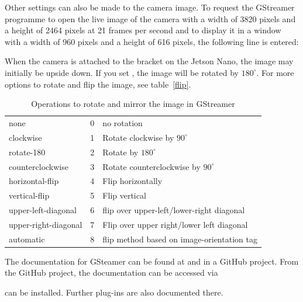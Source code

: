 Other settings can also be made to the camera image. To request the GStreamer programme to open the live image of the camera with a width of 3820 pixels and a height of 2464 pixels at 21 frames per second and to display it in a window with a width of 960 pixels and a height of 616 pixels, the following line is entered:

\medskip




    

When the camera is attached to the bracket on the Jetson Nano, the image may initially be upside down. If you set , the image will be rotated by $180^\circ$. For more options to rotate and flip the image, see table~\ref{flip}.

\medskip

\medskip
\begin{table} [H]
    \centering
    \begin{tabular} {l c l}
        none                 & 0 & no rotation \\
        clockwise            & 1 & Rotate clockwise by $90^\circ$ \\
        rotate-180           & 2 & Rotate by $180^\circ$ \\
        counterclockwise     & 3 & Rotate counterclockwise by $90^\circ$ \\
        horizontal-flip      & 4 & Flip horizontally \\
        vertical-flip        & 5 & Flip vertical \\
        upper-left-diagonal  & 6 & flip over upper-left/lower-right diagonal \\
        upper-right-diagonal & 7 & Flip over upper right/lower left diagonal\\
        automatic            & 8 & flip method based on image-orientation tag\\
    \end{tabular}
    \caption{Operations to rotate and mirror the image in GStreamer}
    \label{Flip}
\end{table}


\medskip


The documentation for GSteamer can be found at \Cite{GStreamer:2021} and in a GitHub project. From the GitHub project, the documentation can be accessed via

\medskip


\medskip

can be installed. Further plug-ins are also documented there.
